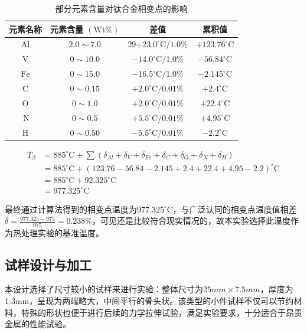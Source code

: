 \begin{table}[htbp]
	\centering
	\caption{部分元素含量对钛合金相变点的影响}
	\label{sec:chem4ti}
	\begin{tabular}{cccc}
		\hline 元素名称 & 元素含量 $(\mathrm{Wt} \%)$ & 差值&累积值 \\
		\hline $\mathrm{Al}$ & $2.0 \sim 7.0$ & 29+$23.0^{\circ} \mathrm{C} / 1.0 \%$ & $+123.76^{\circ} \mathrm{C}$ \\
		$\mathrm{V}$ & $0 \sim 10.0$ & $-14.0^{\circ} \mathrm{C} / 1.0 \%$ & $-56.84^{\circ} \mathrm{C}$ \\
		$\mathrm{Fe}$ & $0 \sim 15.0$ & $-16.5^{\circ} \mathrm{C} / 1.0 \%$ & $-2.145^{\circ} \mathrm{C}$
		\\
		$\mathrm{C}$ & $0 \sim 0.15$ & $+2.0^{\circ} \mathrm{C} / 0.01 \%$ &$ +2.4^{\circ} \mathrm{C} $\\
		$\mathrm{O}$ & $0 \sim 1.0$ & $+2.0^{\circ} \mathrm{C} / 0.01 \%$& $ +22.4^{\circ} \mathrm{C} $\\
		$\mathrm{~N}$ & $0 \sim 0.5$ & $+5.5^{\circ} \mathrm{C} / 0.01 \%$& $ +4.95^{\circ} \mathrm{C} $\\
		$\mathrm{H}$ & $0 \sim 0.50$ & $-5.5^{\circ} \mathrm{C} / 0.01 \%$ &$ -2.2^{\circ} \mathrm{C} $\\
		\hline
	\end{tabular}
\end{table}
\begin{equation}
	\begin{aligned}
		T_\beta&=885^{\circ} \mathrm{C}+\sum (\delta_{Al}+\delta_{V}+\delta_{Fe}+\delta_{C}+\delta_{O}+\delta_{N}+\delta_{H})\\
		&= 885^{\circ} \mathrm{C}+(123.76-56.84-2.145+2.4+22.4+4.95-2.2)^{\circ} \mathrm{C}\\
		&=885^{\circ} \mathrm{C}+92.325^{\circ} \mathrm{C}\\
		&=977.325^{\circ} \mathrm{C}
	\end{aligned}
\end{equation}

最终通过计算法得到的相变点温度为$977.325^{\circ} \mathrm{C} $，与广泛认同的相变点温度值相差$\delta=\frac{977.325-975}{975}=0.238\% $，可见还是比较符合现实情况的，故本实验选择此温度作为热处理实验的基准温度。


\subsection{试样设计与加工}
本设计选择了尺寸较小的试样来进行实验：整体尺寸为$ 25mm\times 7.5mm $，厚度为1.3mm，呈现为两端略大，中间平行的骨头状。该类型的小件试样不仅可以节约材料，特殊的形状也便于进行后续的力学拉伸试验，满足实验要求，十分适合于昂贵金属的性能试验。

